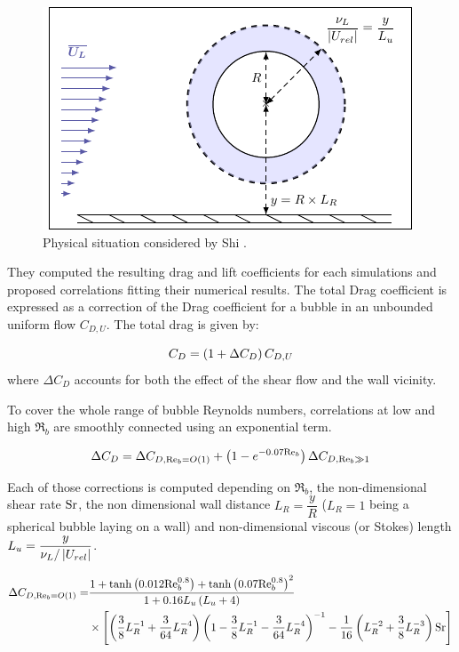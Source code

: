 \begin{figure}[h!]
\centering
\includegraphics[width=0.55\linewidth]{img/forces/shi_scheme.pdf}
\caption{Physical situation considered by Shi \etal \cite{shi_drag_2021}.}
\label{fig:shi_scheme}
\end{figure}


They computed the resulting drag and lift coefficients for each simulations and proposed correlations fitting their numerical results. The total Drag coefficient is expressed as a correction of the Drag coefficient for a bubble in an unbounded uniform flow  $C_{D,U}$. The total drag is given by:

\begin{equation}
C_{D}=\left( 1+\Delta C_{D} \right)C_{D,U}
\end{equation}
where $\Delta C_{D}$ accounts for both the effect of the shear flow and the wall vicinity. 

\npar
To cover the whole range of bubble Reynolds numbers, correlations at low and high $\Re_{b}$ are smoothly connected using an exponential term.

\begin{equation}
\Delta C_{D}=\Delta C_{D,\mathrm{Re}_{b}=O\left( 1 \right)}+\left( 1-e^{-0.07\mathrm{Re}_{b}} \right)\Delta C_{D,{\mathrm{Re}_{b}\gg 1}}
\label{eq:drag_corr_shi}
\end{equation}


Each of those corrections is computed depending on $\Re_{b}$,  the non-dimensional shear rate $\mathrm{Sr}$, the non dimensional wall distance $L_{R} = \dfrac{y}{R}$   ($L_{R}=1$ being a spherical bubble laying on a wall) and non-dimensional viscous (or Stokes) length $L_{u}=\dfrac{y}{\nu_{L}/\left| U_{rel} \right|}$. 


\begin{align}
\nonumber \Delta C_{D,\mathrm{Re}_{b}=O\left( 1 \right)} = & \frac{1+\mathrm{tanh}\left( 0.012\mathrm{Re}_{b}^{0.8} \right) + \mathrm{tanh}\left( 0.07\mathrm{Re}_{b}^{0.8} \right)^{2}}{1+0.16L_{u}\left( L_{u}+4 \right)}\\
& \times \left[ \left(\frac{3}{8}L_{R}^{-1} + \frac{3}{64}L_{R}^{-4}\right) \left(1- \frac{3}{8}L_{R}^{-1}-\frac{3}{64}L_{R}^{-4}\right)^{-1} - \frac{1}{16}\left(L_{R}^{-2}+\frac{3}{8}L_{R}^{-3}\right)\text{Sr} \right]
\end{align}




